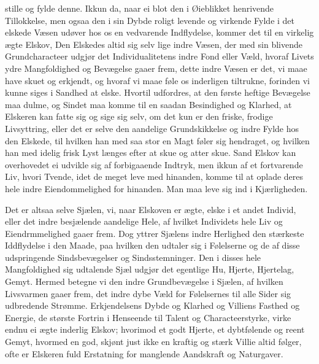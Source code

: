 \documentclass[12pt,a4paper]{book}
\newcommand{\apage}[1]{\marginnote{\footnotesize\textit{[#1]}}}
\begin{document}
stille og fylde denne. Ikkun da, naar ei blot den i Øieblikket
henrivende Tillokkelse, men ogsaa den i sin Dybde roligt levende og
virkende Fylde i det elskede Væsen udøver hos os en vedvarende
Indflydelse, kommer det til en virkelig ægte Elskov, Den Elskedes altid
sig selv lige indre Væsen, der med sin blivende \apage{11} Grundcharacteer udgjør
det Individualitetens indre Fond eller Væld, hvoraf Livets ydre
Mangfoldighed og Bevægelse gaaer frem, dette indre Væsen er det, vi
maae have skuet og erkjendt, og hvoraf vi maae føle os inderligen
tiltrukne, forinden vi kunne siges i Sandhed at elske. Hvortil
udfordres, at den første heftige Bevægelse maa dulme, og Sindet maa
komme til en saadan Besindighed og Klarhed, at Elskeren kan fatte sig
og sige sig selv, om det kun er den friske, frodige Livsyttring, eller
det er selve den aandelige Grundskikkelse og indre Fylde hos den
Elskede, til hvilken han med saa stor en Magt føler sig hendraget, og
hvilken han med idelig frisk Lyst længes efter at skue og atter skue.
Sand Elskov kan overhovedet ei udvikle sig af forbigaaende Indtryk, men
ikkun af et fortvarende Liv, hvori Tvende, idet de meget leve med
hinanden, komme til at oplade deres hele indre Eiendommelighed for
hinanden. Man maa leve sig ind i Kjærligheden.

Det er altsaa selve Sjælen, vi, naar Elskoven er ægte, elske i et andet
Individ, eller det indre besjælende aandelige Hele, af hvilket
Individets hele Liv og Eiendrmmelighed gaaer frem. Dog yttrer Sjælens
indre Herlighed den stærkeste Iddflydelse i den Maade, paa hvilken den
udtaler sig i Følelserne og de af disse udspringende Sindsbevægelser og
Sindsstemninger. Den i disses hele Mangfoldighed sig udtalende Sjæl
udgjør det egentlige Hu, Hjerte, Hjertelag, Gemyt. Hermed betegne vi
den indre Grundbevægelse i Sjælen, af \apage{12} hvilken Livsvarmen gaaer frem,
det indre dybe Væld for Følelsernes til alle Sider sig udbredende
Strømme. Erkjendelsens Dybde og Klarhed og Villiens Fasthed og Energie,
de største Fortrin i Henseende til Talent og Characteerstyrke, virke
endnu ei ægte inderlig Elskov; hvorimod et godt Hjerte, et dybtfølende
og reent Gemyt, hvormed en god, skjønt just ikke en kraftig og stærk
Villie altid følger, ofte er Elskeren fuld Erstatning for manglende
Aandskraft og Naturgaver.
\end{document}

